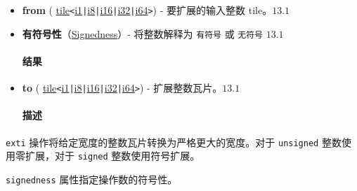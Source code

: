 \documentclass{article}
\begin{document}
\begin{itemize}
\item \textbf{from} ( \href{https://docs.nvidia.com/cuda/tile-ir/latest/sections/types.html#type-tile}{tile}\texttt{<}\href{https://docs.nvidia.com/cuda/tile-ir/latest/sections/types.html#subsection-element-types}{i1}\texttt{|}\href{https://docs.nvidia.com/cuda/tile-ir/latest/sections/types.html#subsection-element-types}{i8}\texttt{|}\href{https://docs.nvidia.com/cuda/tile-ir/latest/sections/types.html#subsection-element-types}{i16}\texttt{|}\href{https://docs.nvidia.com/cuda/tile-ir/latest/sections/types.html#subsection-element-types}{i32}\texttt{|}\href{https://docs.nvidia.com/cuda/tile-ir/latest/sections/types.html#subsection-element-types}{i64}\texttt{>}) - 要扩展的输入整数 tile。$\boxed{13.1}$
\item \textbf{有符号性}（\href{https://docs.nvidia.com/cuda/tile-ir/latest/sections/operations.html#op-attribute-cuda-tile-exti-signedness-attr}{Signedness}）- 将整数解释为 \texttt{有符号} 或 \texttt{无符号} $\boxed{13.1}$


\paragraph{结果}

\item \textbf{to} ( \href{https://docs.nvidia.com/cuda/tile-ir/latest/sections/types.html#type-tile}{tile}\texttt{<}\href{https://docs.nvidia.com/cuda/tile-ir/latest/sections/types.html#subsection-element-types}{i1}\texttt{|}\href{https://docs.nvidia.com/cuda/tile-ir/latest/sections/types.html#subsection-element-types}{i8}\texttt{|}\href{https://docs.nvidia.com/cuda/tile-ir/latest/sections/types.html#subsection-element-types}{i16}\texttt{|}\href{https://docs.nvidia.com/cuda/tile-ir/latest/sections/types.html#subsection-element-types}{i32}\texttt{|}\href{https://docs.nvidia.com/cuda/tile-ir/latest/sections/types.html#subsection-element-types}{i64}\texttt{>}) - 扩展整数瓦片。$\boxed{13.1}$


\paragraph{描述}

\end{itemize}
\texttt{exti} 操作将给定宽度的整数瓦片转换为严格更大的宽度。对于 \texttt{unsigned} 整数使用零扩展，对于 \texttt{signed} 整数使用符号扩展。


\texttt{signedness} 属性指定操作数的符号性。
\end{document}
